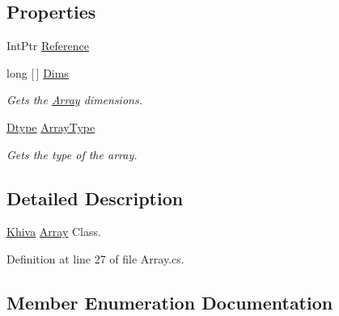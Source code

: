 \subsection*{Properties}
\begin{DoxyCompactItemize}
\item 
Int\+Ptr \mbox{\hyperlink{classkhiva_1_1array_1_1_array_abfcf232b5b58cb7e4947ea1c10068efa}{Reference}}
\item 
long \mbox{[}$\,$\mbox{]} \mbox{\hyperlink{classkhiva_1_1array_1_1_array_affdbea2ed2a063b156b6289d44591505}{Dims}}
\begin{DoxyCompactList}\small\item\em Gets the \mbox{\hyperlink{classkhiva_1_1array_1_1_array}{Array}} dimensions. \end{DoxyCompactList}\item 
\mbox{\hyperlink{classkhiva_1_1array_1_1_array_a6bc9c0c6ade06a8675643de4880a116c}{Dtype}} \mbox{\hyperlink{classkhiva_1_1array_1_1_array_addb89dab0c05f4d0b3157a948702b47d}{Array\+Type}}
\begin{DoxyCompactList}\small\item\em Gets the type of the array. \end{DoxyCompactList}\end{DoxyCompactItemize}


\subsection{Detailed Description}
\mbox{\hyperlink{classkhiva_1_1_khiva}{Khiva}} \mbox{\hyperlink{classkhiva_1_1array_1_1_array}{Array}} Class. 



Definition at line 27 of file Array.\+cs.



\subsection{Member Enumeration Documentation}
\mbox{\label{classkhiva_1_1array_1_1_array_a6bc9c0c6ade06a8675643de4880a116c}} 
